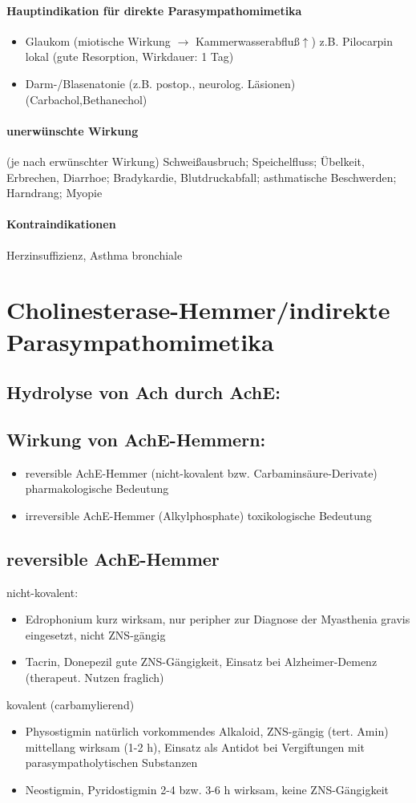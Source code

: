 \documentclass[10pt,a4paper]{report}
\begin{document}
\paragraph{Hauptindikation für direkte Parasympathomimetika}
\begin{itemize}
	\item Glaukom (miotische Wirkung $\rightarrow$ Kammerwasserabfluß$\uparrow$) z.B. Pilocarpin lokal (gute Resorption, Wirkdauer: 1 Tag)
	\item Darm-/Blasenatonie (z.B. postop., neurolog. Läsionen)(Carbachol,Bethanechol)
\end{itemize}
\paragraph{unerwünschte Wirkung}(je nach erwünschter Wirkung)
Schweißausbruch; Speichelfluss; Übelkeit, Erbrechen, Diarrhoe; Bradykardie, Blutdruckabfall; asthmatische Beschwerden; Harndrang; Myopie
\paragraph{Kontraindikationen} Herzinsuffizienz, Asthma bronchiale
\section{Cholinesterase-Hemmer/indirekte Parasympathomimetika}
\subsection{Hydrolyse von Ach durch AchE:}
\subsection{Wirkung von AchE-Hemmern:}
\begin{itemize}
	\item reversible AchE-Hemmer (nicht-kovalent bzw. Carbaminsäure-Derivate) pharmakologische  Bedeutung
	\item irreversible AchE-Hemmer (Alkylphosphate) toxikologische Bedeutung
\end{itemize}
\subsection{reversible AchE-Hemmer}
nicht-kovalent:
\begin{itemize}
	\item Edrophonium kurz wirksam, nur peripher zur Diagnose der Myasthenia gravis eingesetzt, nicht ZNS-gängig
	\item Tacrin, Donepezil gute ZNS-Gängigkeit, Einsatz bei Alzheimer-Demenz (therapeut. Nutzen fraglich)
\end{itemize}
kovalent (carbamylierend)
\begin{itemize}
	\item Physostigmin natürlich vorkommendes Alkaloid, ZNS-gängig (tert. Amin) mittellang wirksam (1-2 h), Einsatz als Antidot bei Vergiftungen mit parasympatholytischen Substanzen 
	\item Neostigmin, Pyridostigmin 2-4 bzw. 3-6 h wirksam, keine ZNS-Gängigkeit
\end{itemize}
\end{document}
